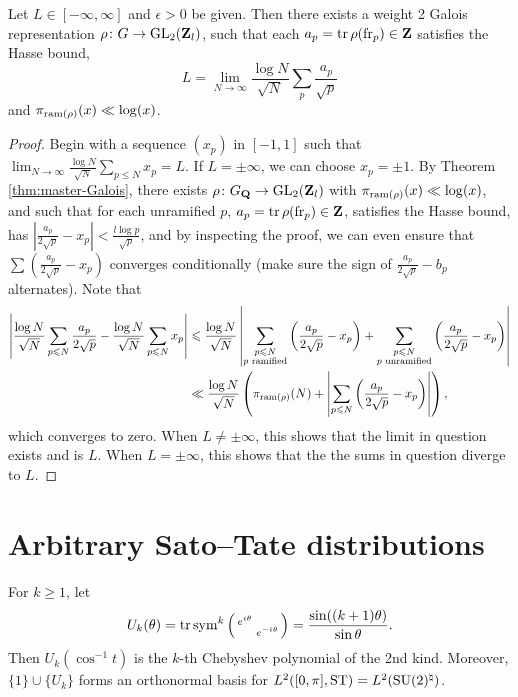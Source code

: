 \begin{corollary}
Let $L \in [-\infty,\infty]$ and $\epsilon>0$ be given. Then there exists a 
weight 2 Galois representation $\rho\colon G\to \operatorname{GL}_2(\mathbf{Z}_l)$, such that 
each $a_p = \operatorname{tr}\rho(\mathrm{fr}_p)\in \mathbf{Z}$ satisfies the Hasse bound, 
\[
	L = \lim_{N\to \infty} \frac{\log N}{\sqrt N}\sum_p \frac{a_p}{\sqrt p} 
\]
and $\pi_{\mathrm{ram}(\rho)}(x) \ll \log(x)$. 
\end{corollary}
\begin{proof}
Begin with a sequence $(x_p)$ in $[-1,1]$ such that 
$\lim_{N\to \infty} \frac{\log N}{\sqrt N}\sum_{p\leqslant N} x_p = L$. If 
$L=\pm \infty$, we can choose $x_p = \pm 1$. By Theorem 
\ref{thm:master-Galois}, there exists $\rho\colon G_{\mathbf{Q}} \to \operatorname{GL}_2(\mathbf{Z}_l)$ with 
$\pi_{\mathrm{ram}(\rho)}(x) \ll \log(x)$, and such that for each unramified $p$, 
$a_p = \operatorname{tr}\rho(\mathrm{fr}_p)\in \mathbf{Z}$, satisfies the Hasse bound, has 
$\left| \frac{a_p}{2\sqrt p} - x_p\right| < \frac{l \log p}{\sqrt p}$, and by 
inspecting the proof, we can even ensure that 
$\sum \left(\frac{a_p}{2\sqrt p} - x_p\right)$ converges conditionally (make 
sure the sign of $\frac{a_p}{2\sqrt p} - b_p$ alternates). Note that
\begin{align*}
	\left|\frac{\log N}{\sqrt N}\sum_{p\leqslant N} \frac{a_p}{2\sqrt p} - \frac{\log N}{\sqrt N} \sum_{p\leqslant N} x_p\right| 
		&\leqslant \frac{\log N}{\sqrt N}\left|\sum_{\substack{p\leqslant N \\ p\text{ ramified}}} \left(\frac{a_p}{2 \sqrt p} - x_p\right) + \sum_{\substack{p\leqslant N \\ p\text{ unramified}}} \left(\frac{a_p}{2 \sqrt p} - x_p\right) \right|  \\
		&\ll \frac{\log N}{\sqrt N} \left(\pi_{\mathrm{ram}(\rho)}(N) + \left|\sum_{p\leqslant N} \left(\frac{a_p}{2 \sqrt p} - x_p\right)\right|\right) ,
\end{align*}
which converges to zero. 
When $L\ne \pm\infty$, this shows that the limit in question exists and is $L$. 
When $L=\pm \infty$, this shows that the the sums in question diverge to $L$. 
\end{proof}





\section{Arbitrary Sato--Tate distributions}

For $k\geqslant 1$, let 
\[
	U_k(\theta) = \operatorname{tr}\operatorname{sym}^k\left(\begin{smallmatrix} e^{i\theta} &  \\  & e^{- i \theta} \end{smallmatrix}\right) = \frac{\sin((k+1)\theta)}{\sin\theta} .
\]
Then $U_k(\cos^{-1} t)$ is the $k$-th Chebyshev polynomial of the 2nd kind. 
Moreover, $\{1\}\cup\{U_k\}$ forms an orthonormal basis for 
$L^2([0,\pi],\mathrm{ST}) = L^2(\operatorname{SU}(2)^\natural)$. 

